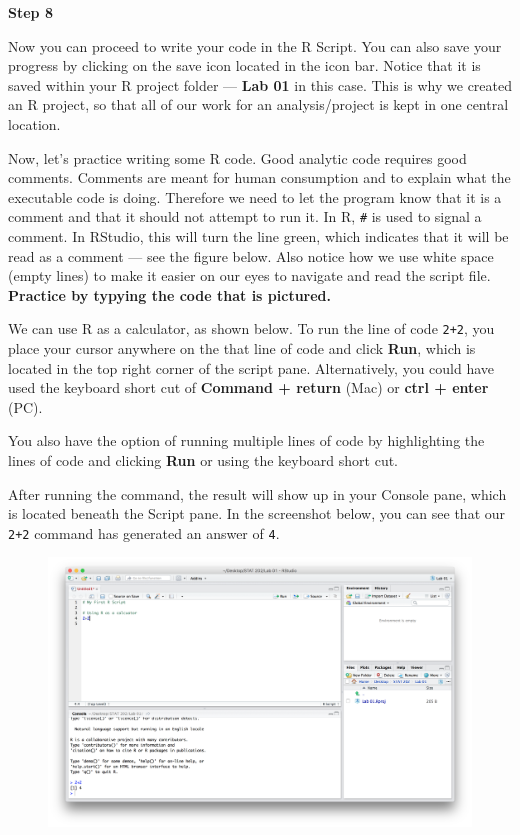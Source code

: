 \documentclass[]{book}
\theoremstyle{definition}
\theoremstyle{definition}
\theoremstyle{definition}
\theoremstyle{remark}
\begin{document}
\textbf{Step 8}

Now you can proceed to write your code in the R Script. You can also
save your progress by clicking on the save icon located in the icon bar.
Notice that it is saved within your R project folder --- \textbf{Lab 01}
in this case. This is why we created an R project, so that all of our
work for an analysis/project is kept in one central location.

Now, let's practice writing some R code. Good analytic code requires
good comments. Comments are meant for human consumption and to explain
what the executable code is doing. Therefore we need to let the program
know that it is a comment and that it should not attempt to run it. In
R, \texttt{\#} is used to signal a comment. In RStudio, this will turn
the line green, which indicates that it will be read as a comment ---
see the figure below. Also notice how we use white space (empty lines)
to make it easier on our eyes to navigate and read the script file.
\textbf{Practice by typying the code that is pictured.}

We can use R as a calculator, as shown below. To run the line of code
\texttt{2+2}, you place your cursor anywhere on the that line of code
and click \textbf{Run}, which is located in the top right corner of the
script pane. Alternatively, you could have used the keyboard short cut
of \textbf{Command + return} (Mac) or \textbf{ctrl + enter} (PC).

You also have the option of running multiple lines of code by
highlighting the lines of code and clicking \textbf{Run} or using the
keyboard short cut.

After running the command, the result will show up in your Console pane,
which is located beneath the Script pane. In the screenshot below, you
can see that our \texttt{2+2} command has generated an answer of
\texttt{4}.

\begin{figure}
\centering
\includegraphics{./assets/images/01-07.png}
\caption{}
\end{figure}
\end{document}
